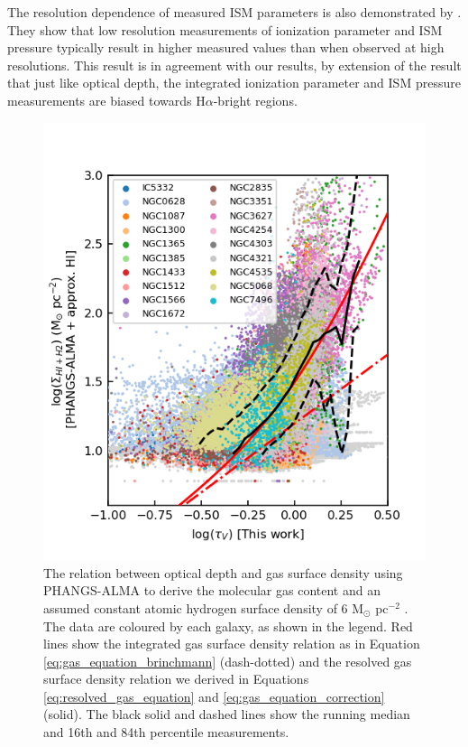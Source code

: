 \documentclass[fleqn,usenatbib]{mnras}
\begin{document}
The resolution dependence of measured ISM parameters is also demonstrated by \cite{grasha2022}. They show that low resolution measurements of ionization parameter and ISM pressure typically result in higher measured values than when observed at  high resolutions. This result is in agreement with our results, by extension of the result that just like optical depth, the integrated ionization parameter and ISM pressure measurements are biased towards H$\alpha$-bright regions. 

\begin{figure}
    \centering
    \includegraphics[width=\columnwidth]{figures/fig8.png}
    \caption{The relation between optical depth and gas surface density using PHANGS-ALMA to derive the molecular gas content and an assumed constant atomic hydrogen surface density of 6 M$_{\odot}$ pc$^{-2}$ \citep{leroy2021}. The data are coloured by each galaxy, as shown in the legend. Red lines show the integrated gas surface density relation as in Equation \ref{eq:gas_equation_brinchmann} (dash-dotted) and the resolved gas surface density relation we derived in Equations \ref{eq:resolved_gas_equation} and \ref{eq:gas_equation_correction} (solid). The black solid and dashed lines show the running median and 16th and 84th percentile measurements. }
    \label{fig:MUSE_optical_depth_comparison_PHANGS_ALMA}
\end{figure}
\end{document}
